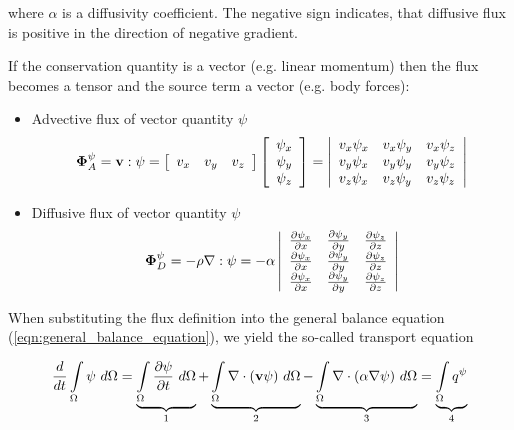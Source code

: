 where $\alpha$ is a diffusivity coefficient. The negative sign indicates, that diffusive flux is positive in the direction of negative gradient.

If the conservation quantity is a vector (e.g. linear momentum)
then the flux becomes a tensor and the source term a vector (e.g. body forces):

\begin{itemize}

\item Advective flux of vector quantity $\psi$
%
\begin{eqnarray}
{\bf\Phi}^\psi_A
=
{\bf v}:{\mathbf{\psi}}
=
\left[
\begin{array}{ccc}
v_x & v_y & v_z
\end{array}
\right]
\left[
\begin{array}{c}
\psi_x \\ \psi_y \\ \psi_z
\end{array}
\right]
=
\left|
\begin{array} {lll}
v_x \psi_x &  v_x \psi_y & v_x \psi_z \\
v_y \psi_x &  v_y \psi_y & v_y \psi_z \\
v_z \psi_x &  v_z \psi_y & v_z \psi_z
\end{array}
\right|
\end{eqnarray}

\item Diffusive flux of vector quantity $\psi$
%
\begin{eqnarray}
{\bf\Phi}^\psi_D
=
-\rho \nabla:{\mathbf{\psi}}
=
-\alpha
\left|
\begin{array} {lll}
\frac{\partial\psi_x}{\partial x} & \frac{\partial\psi_y}{\partial y} & \frac{\partial\psi_z}{\partial z} \\
\frac{\partial\psi_x}{\partial x} & \frac{\partial\psi_y}{\partial y} & \frac{\partial\psi_z}{\partial z} \\
\frac{\partial\psi_x}{\partial x} & \frac{\partial\psi_y}{\partial y} & \frac{\partial\psi_z}{\partial z}
\end{array}
\right|
\end{eqnarray}
\end{itemize}

When substituting the flux definition into the general balance equation (\ref{eqn:general_balance_equation}),
we yield the so-called transport equation

\begin{eqnarray}
\frac{d}{dt} \int\limits_\Omega \psi~d\Omega
=
\underbrace{\int\limits_\Omega \frac{\partial\psi}{\partial t}~d\Omega}_{1}
+
\underbrace{\int\limits_\Omega \nabla \cdot ({\bf v}\psi)~d\Omega}_{2}
-
\underbrace{\int\limits_\Omega \nabla \cdot (\alpha\nabla\psi)~d\Omega}_{3}
=
\underbrace{\int\limits_\Omega q^\psi}_{4}
\label{eqn:integral_balance_equation}
\end{eqnarray}

